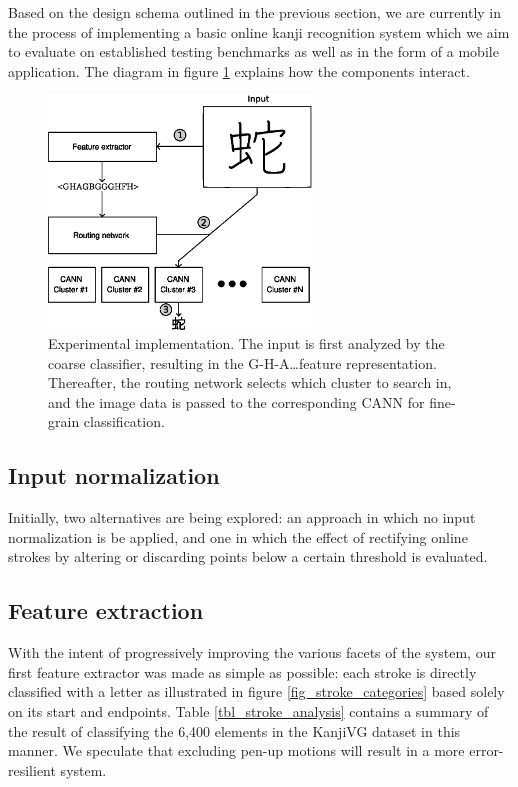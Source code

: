\documentclass[10pt,conference,a4paper]{IEEEtran}
\begin{document}
	Based on the design schema outlined in the previous section, we are currently in the process of implementing 
	a basic online kanji recognition system which we aim to evaluate on established testing benchmarks
	as well as in the form of a mobile application. The diagram in figure \ref{fig_experimental_implementation} 
	explains how the components interact.

	\begin{figure}
		\centering
		\includegraphics[width=2.75in]{./fig/experimental-implementation.eps}
		\caption{Experimental implementation. The input is first analyzed by the coarse classifier, resulting in the G-H-A\ldots feature representation.
		Thereafter, the routing network selects which cluster to search in, and the image data is passed to the corresponding CANN for fine-grain classification.}
		\label{fig_experimental_implementation}
	\end{figure}


	\subsection{Input normalization}

	Initially, two alternatives are being explored: an approach in which no input normalization is be applied, and one 
	in which the effect of rectifying online strokes by altering or discarding points below a certain threshold is evaluated.


	\subsection{Feature extraction}

	With the intent of progressively improving the various facets of the system,
	our first feature extractor was made as simple as possible: each stroke is directly
	classified with a letter as illustrated in figure \ref{fig_stroke_categories} based solely
	on its start and endpoints. Table \ref{tbl_stroke_analysis} contains a summary of the
	result of classifying the 6,400 elements in the KanjiVG dataset in this manner.
	We speculate that excluding pen-up motions will result in a more error-resilient system.
\end{document}
